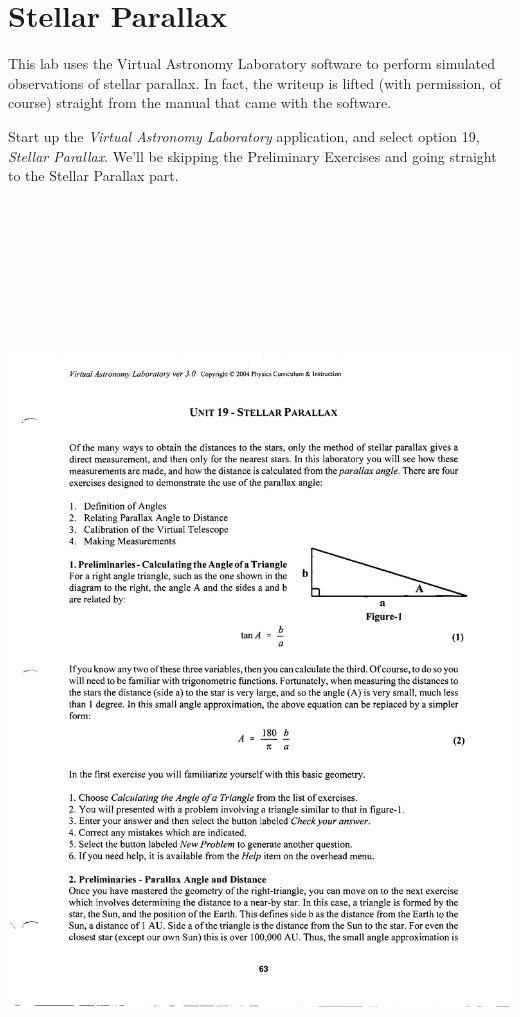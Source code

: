 \chapter{Stellar Parallax}

This lab uses the Virtual Astronomy Laboratory software to perform
simulated observations of stellar parallax.  In fact, the writeup
is lifted (with permission, of course) straight from the manual
that came with the software.

Start up the 
{\it Virtual Astronomy Laboratory} application,
and select option 19, {\it Stellar
Parallax}.  We'll be skipping the Preliminary Exercises and going
straight to the Stellar Parallax part.  

\newpage

\hskip-0.5in\includegraphics[height=10in]{val/parallax1.eps}

